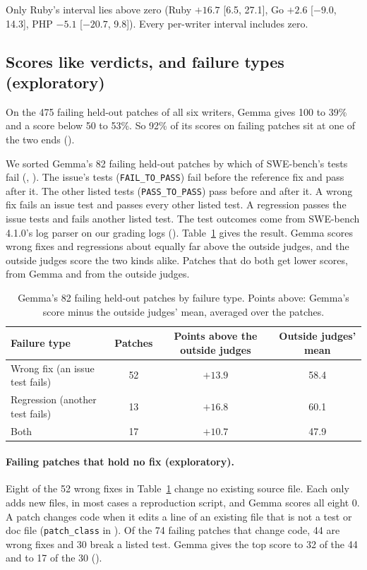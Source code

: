 \documentclass[10pt,letterpaper]{article}
\begin{document}
Only Ruby's interval lies above zero (Ruby $+16.7$ [6.5, 27.1], Go $+2.6$ [$-9.0$, 14.3], PHP $-5.1$ [$-20.7$, 9.8]).
Every per-writer interval includes zero.

\subsection*{Scores like verdicts, and failure types (exploratory)}

On the 475 failing held-out patches of all six writers, Gemma gives 100 to 39\% and a score below 50 to 53\%. So 92\%
of its scores on failing patches sit at one of the two ends ().

We sorted Gemma's 82 failing held-out patches by which of SWE-bench's tests fail (,
). The issue's tests (\texttt{FAIL\_TO\_PASS}) fail before the reference fix
and pass after it. The other listed tests (\texttt{PASS\_TO\_PASS}) pass before and after it. A wrong fix fails an
issue test and passes every other listed test. A regression passes the issue tests and fails another listed test. The
test outcomes come from SWE-bench 4.1.0's log parser on our grading logs ().
Table~\ref{tab:types} gives the result. Gemma scores wrong fixes and regressions about equally far above the outside
judges, and the outside judges score the two kinds alike. Patches that do both get lower scores, from Gemma and from the outside judges.

\begin{table}[H]
\centering
\small
\caption{Gemma's 82 failing held-out patches by failure type. Points above: Gemma's score minus the outside judges'
mean, averaged over the patches.}
\label{tab:types}
\begin{tabular}{@{}lccc@{}}
\toprule
Failure type & Patches & Points above the outside judges & Outside judges' mean \\
\midrule
Wrong fix (an issue test fails) & 52 & $+13.9$ & 58.4 \\
Regression (another test fails) & 13 & $+16.8$ & 60.1 \\
Both & 17 & $+10.7$ & 47.9 \\
\bottomrule
\end{tabular}
\end{table}

\paragraph{Failing patches that hold no fix (exploratory).} Eight of the 52 wrong fixes in Table~\ref{tab:types}
change no existing source file. Each only adds new files, in most cases a reproduction script, and Gemma scores all
eight 0. A patch changes code when it edits a line of an existing file that is not a test or doc file
(\texttt{patch\_class} in ). Of the 74 failing patches that change code, 44 are wrong
fixes and 30 break a listed test. Gemma gives the top score to 32 of the 44 and to 17 of the 30
().
\end{document}
